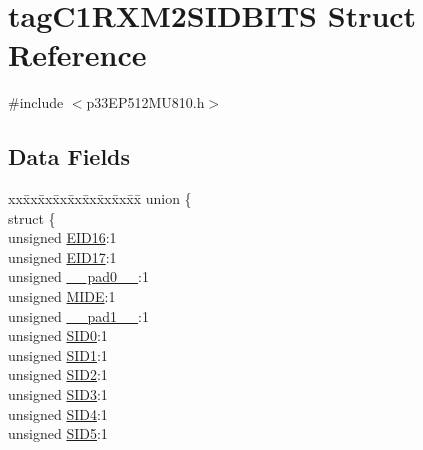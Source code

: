 \hypertarget{structtag_c1_r_x_m2_s_i_d_b_i_t_s}{}\section{tag\+C1\+R\+X\+M2\+S\+I\+D\+B\+I\+TS Struct Reference}
\label{structtag_c1_r_x_m2_s_i_d_b_i_t_s}


{\ttfamily \#include $<$p33\+E\+P512\+M\+U810.\+h$>$}

\subsection*{Data Fields}
\begin{DoxyCompactItemize}
\item 
\begin{tabbing}
xx\=xx\=xx\=xx\=xx\=xx\=xx\=xx\=xx\=\kill
union \{\\
\>struct \{\\
\>\>unsigned \hyperlink{structtag_c1_r_x_m2_s_i_d_b_i_t_s_a6dd5663b0c9838c56db040560ca0efa1}{EID16}:1\\
\>\>unsigned \hyperlink{structtag_c1_r_x_m2_s_i_d_b_i_t_s_aa648615464b0eb29967529333eee9fd9}{EID17}:1\\
\>\>unsigned \hyperlink{structtag_c1_r_x_m2_s_i_d_b_i_t_s_adf71f3d8410c1f1dbbc96680a92c49af}{\_\_pad0\_\_}:1\\
\>\>unsigned \hyperlink{structtag_c1_r_x_m2_s_i_d_b_i_t_s_a3febd6bba68dc9477425e6ef6020e88a}{MIDE}:1\\
\>\>unsigned \hyperlink{structtag_c1_r_x_m2_s_i_d_b_i_t_s_acaf2d0924a107ec6e8d2e31febaf66f9}{\_\_pad1\_\_}:1\\
\>\>unsigned \hyperlink{structtag_c1_r_x_m2_s_i_d_b_i_t_s_a1ca276ac15df60e1f7b9a6d0011ade93}{SID0}:1\\
\>\>unsigned \hyperlink{structtag_c1_r_x_m2_s_i_d_b_i_t_s_a3405d354f81391f879648f69f504dfc8}{SID1}:1\\
\>\>unsigned \hyperlink{structtag_c1_r_x_m2_s_i_d_b_i_t_s_ad744966dfc49307f731b7045b01b94e5}{SID2}:1\\
\>\>unsigned \hyperlink{structtag_c1_r_x_m2_s_i_d_b_i_t_s_a9345f3e64720be93e83d8dfc827f3f45}{SID3}:1\\
\>\>unsigned \hyperlink{structtag_c1_r_x_m2_s_i_d_b_i_t_s_aefb106fed4bb40e2c3c71ac612c554e3}{SID4}:1\\
\>\>unsigned \hyperlink{structtag_c1_r_x_m2_s_i_d_b_i_t_s_a0f221b3c9612231686bf87ccdcec8489}{SID5}:1\\

\end{tabbing}
\end{DoxyCompactItemize}
